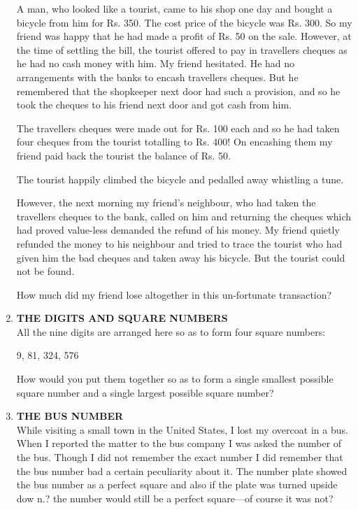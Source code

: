 \documentclass[12pt]{article}
\begin{document}
\begin{enumerate}
A man,  who  looked  like a tourist,  came  to his shop one day  and  bought  a bicycle  from  him  for  Rs. 350. The cost  price  of the  bicycle  was  Rs.  300.  So  my friend  was  happy  that  he had  made  a profit  of Rs. 50 on the sale.  However,  at the time  of settling  the bill,  the tourist  offered  to pay  in travellers  cheques  as he had no cash money  with  him.  My  friend  hesitated.  He  had no arrangements  with  the  banks  to encash  travellers cheques.  But  he remembered  that  the  shopkeeper  next door  had such  a provision,  and so he took  the  cheques to his friend  next  door  and got cash  from  him. 

The travellers  cheques  were  made  out for Rs. 100 each and so he had taken  four  cheques  from  the tourist totalling  to Rs.  400!  On  encashing  them  my friend paid back  the tourist  the balance  of Rs. 50. 

The tourist  happily  climbed  the  bicycle  and pedalled away  whistling  a tune. 

However,  the next  morning  my friend's  neighbour,  who had taken  the  travellers  cheques  to the bank,  called  on him and returning  the cheques  which  had  proved  value-less demanded  the  refund  of his money.  My  friend quietly  refunded  the  money  to his neighbour  and tried to trace  the tourist  who  had given  him  the  bad  cheques and taken  away  his bicycle.  But  the  tourist  could  not be found. 

How  much  did my friend  lose  altogether  in this  un-fortunate  transaction? 

%
\item  \textbf{THE  DIGITS  AND  SQUARE  NUMBERS} \\
All the  nine  digits  are  arranged  here  so as to form four square  numbers: 

9, 81,  324,  576 

How  would  you  put  them  together  so as to form  a single  smallest  possible  square  number  and a single  largest possible  square  number? 

%
\item  \textbf{THE  BUS  NUMBER} \\
While  visiting  a small  town  in the  United  States,  I lost my overcoat  in a bus.  When  I reported  the matter  to the bus company  I was asked  the number  of the bus.  Though I did not  remember  the  exact  number  I did  remember that the bus number  bad  a certain  peculiarity  about  it. The number  plate  showed  the  bus number  as a perfect square  and also  if the plate  was  turned upside  dow n.? the number  would  still  be a perfect  square—of  course  it was not? 


\end{enumerate}
\end{document}
